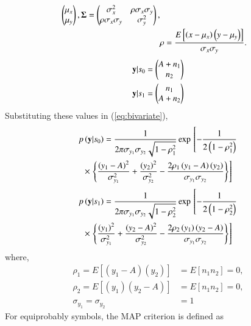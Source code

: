 \documentclass[journal,12pt,twocolumn]{IEEEtran}
\renewcommand\thesection{\arabic{section}}
\begin{document}
\begin{enumerate}[label=\thesection.\arabic*
,ref=\thesection.\theenumi]
\begin{align}
\begin{pmatrix*}
\mu_x \\
\mu_y
\end{pmatrix*},
\mbf{\Sigma} = 
\begin{pmatrix*}%
\sigma_x^2 & \rho\sigma_x\sigma_y \\
\rho\sigma_x\sigma_y & \sigma_y^2
\end{pmatrix*},\\
&\rho = \frac{E\sbrak{\brak{x - \mu_x}\brak{y-\mu_y}}}{\sigma_x\sigma_y}.
\end{align}
%
\begin{align}
    \mathbf{y}|s_0 &= 
    \begin{pmatrix}
    A+n_1 \\
    n_2
    \end{pmatrix}\\
    \mathbf{y}|s_1 &=  
    \begin{pmatrix}
    n_1 \\
    A+n_2
    \end{pmatrix}
    \end{align}
    Substituting these values in (\ref{eq:bivariate}),
    \begin{multline}
    \label{gauss_mutl_var1}
    p\left(\mathbf{y}|s_0\right) = \frac{1}{2\pi\sigma_{y_1}\sigma_{y_2}\sqrt{1-\rho_1^2}}\exp{}\left[-\frac{1}{2\left(1-\rho_1^2\right)}\right.
    \\
    \times {}\left.\left\{\frac{\left(y_1-A\right)^2}{\sigma_{y_1}^2}+\frac{\left(y_2\right)^2}{\sigma_{y_2}^2}-\frac{2\rho_1\left(y_1-A\right)\left(y_2\right)}{\sigma_{y_1}\sigma_{y_2}}\right\}\right]
    \end{multline}
    \begin{multline}
    \label{gauss_mutl_var2}
    p\left(\mathbf{y}|s_1\right) = \frac{1}{2\pi\sigma_{y_1}\sigma_{y_2}\sqrt{1-\rho_2^2}}\exp{}\left[-\frac{1}{2\left(1-\rho_2^2\right)}\right.
    \\
    \times {}\left.\left\{\frac{\left(y_1\right)^2}{\sigma_{y_1}^2}+\frac{\left(y_2-A\right)^2}{\sigma_{y_2}^2}-\frac{2\rho_2\left(y_1\right)\left(y_2-A\right)}{\sigma_{y_1}\sigma_{y_2}}\right\}\right]
    \end{multline}
    where,
    \begin{align}
    \label{rho_sig_val}
    \rho_1 = E[(y_1-A)(y_2)] &= E[n_1 n_2] = 0, \nonumber \\
    \rho_2 = E[(y_1)(y_2-A)] &= E[n_1 n_2] = 0, \nonumber \\
    \sigma_{y_1} = \sigma_{y_2} &= 1
    \end{align}
    For equiprobably symbols, the MAP criterion is defined as
    \begin{align}

\end{align}
\end{enumerate}
\end{document}
